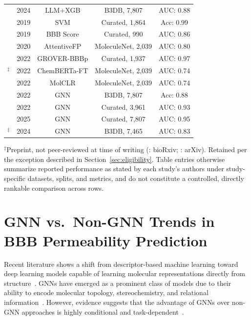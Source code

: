 \documentclass[conference]{IEEEtran}
\begin{document}
\begin{table}[htbp]
\begin{tabularx}{\columnwidth}{ccccc}
\cite{Huang2024}       & 2024 & LLM+XGB      & B3DB, 7,807        & AUC: 0.88  \\
\cite{Roy2019}         & 2019 & SVM          & Curated, 1,864     & Acc: 0.99  \\
\cite{Gupta2019}       & 2019 & BBB Score    & Curated, 990       & AUC: 0.86  \\
\cite{Xiong2020}       & 2020 & AttentiveFP  & MoleculeNet, 2,039 & AUC: 0.80  \\
\cite{Tong2022}        & 2022 & GROVER-BBBp  & Curated, 1,937     & AUC: 0.97  \\
\cite{Ahmad2022chemberta2}$^\ddagger$ & 2022 & ChemBERTa-FT & MoleculeNet, 2,039 & AUC: 0.74 \\
\cite{Wang2022molclr}  & 2022 & MolCLR       & MoleculeNet, 2,039 & AUC: 0.74  \\
\hline
\cite{Gautam2022}      & 2022 & GNN          & B3DB, 7,807        & Acc: 0.88  \\
\cite{Ding2022}        & 2022 & GNN          & Curated, 3,961     & AUC: 0.93  \\
\cite{Koutroumpa2025}  & 2025 & GNN          & Curated, 7,807     & AUC: 0.95  \\
\cite{Collins2024}$^\ddagger$     & 2024 & GNN          & B3DB, 7,465        & AUC: 0.83  \\
\hline
\end{tabularx}
\vspace{2pt}
{\footnotesize $^\ddagger$Preprint, not peer-reviewed at time of
writing (\cite{Collins2024}: bioRxiv; \cite{Ahmad2022chemberta2}:
arXiv). Retained per the exception described in
Section~\ref{sec:eligibility}. Table entries otherwise summarize
reported performance as stated by each study's authors under study-specific
datasets, splits, and metrics, and do not constitute a controlled,
directly rankable comparison across rows.}
\end{table}
\section{GNN vs.\ Non-GNN Trends in BBB Permeability Prediction}

Recent literature shows a shift from descriptor-based machine learning toward deep learning models capable of learning molecular representations directly from structure~\cite{Alsenan2020,Alsenan2021,Kumar2022}. GNNs have emerged
as a prominent class of models due to their ability to encode molecular
topology, stereochemistry, and relational
information~\cite{Collins2024,Ding2022,Gautam2022}. However, evidence
suggests that the advantage of GNNs over non-GNN approaches is highly
conditional and task-dependent~\cite{Tong2022,Kumar2022}.
\end{document}
